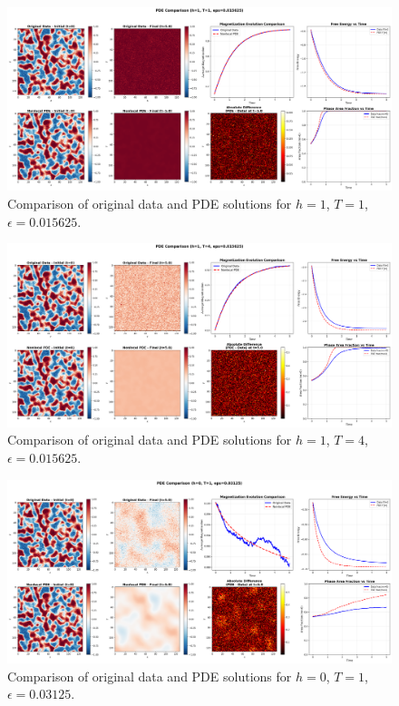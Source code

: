 \documentclass[11pt,a4paper]{article}
\begin{document}
\begin{figure}[!h]
    \centering
    \includegraphics[width=1.0\textwidth]{fig/pde_comparison_h1_T1_eps0.015625.png}
    \caption{Comparison of original data and PDE solutions for $h=1$, $T=1$, $\epsilon=0.015625$.}
\end{figure}


\begin{figure}[!h]
    \centering
    \includegraphics[width=1.0\textwidth]{fig/pde_comparison_h1_T4_eps0.015625.png}
    \caption{Comparison of original data and PDE solutions for $h=1$, $T=4$, $\epsilon=0.015625$.}
\end{figure}


\begin{figure}[!h]
    \centering
    \includegraphics[width=1.0\textwidth]{fig/pde_comparison_h0_T1_eps0.03125.png}
    \caption{Comparison of original data and PDE solutions for $h=0$, $T=1$, $\epsilon=0.03125$.}
\end{figure}
\end{document}
